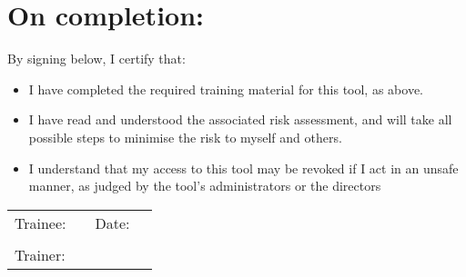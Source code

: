\documentclass[a4paper]{article}
\begin{document}
\vspace*{\fill}
\section*{On completion:}

By signing below, I certify that:

\begin{itemize}
    \item I have completed the required training material for this tool, as above.
    \item I have read and understood the associated risk assessment, and will take all possible steps to minimise the risk to myself and others.
    \item I understand that my access to this tool may be revoked if I act in an unsafe manner, as judged by the tool's administrators or the directors
\end{itemize}

\begin{tabularx}{\textwidth}{ l  X  l  X }
  \endhead
Trainee: &  & Date: & \\ \\
Trainer: & & &
\end{tabularx}
\end{document}
